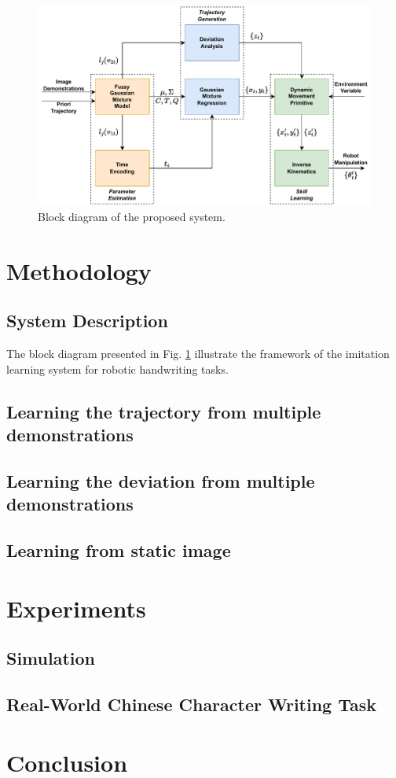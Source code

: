 \documentclass[journal]{IEEEtran}
\begin{document}
\begin{figure}[!t]
    \centering
    \includegraphics[width=6in]{./fig/fig1.pdf}
    \caption{Block diagram of the proposed system.}
    \label{fig1}
\end{figure}

\section{Methodology}
\subsection{System Description}
The block diagram presented in Fig. \ref{fig1} illustrate the framework of the imitation learning system for robotic handwriting tasks.


\subsection{Learning the trajectory from multiple demonstrations}

\subsection{Learning the deviation from multiple demonstrations}

\subsection{Learning from static image}

\section{Experiments}
\subsection{Simulation}


\subsection{Real-World Chinese Character Writing Task}


\section{Conclusion}





\end{document}
